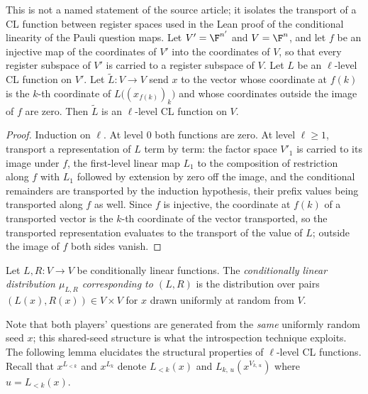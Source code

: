 \begin{lemma}\label{lem:cl-reindex}
	\leanok
	This is not a named statement of the source article; it isolates the transport of a CL function between register spaces used in the Lean proof of the conditional linearity of the Pauli question maps. Let $V' = \F^{n'}$ and $V = \F^{n}$, and let $f$ be an injective map of the coordinates of $V'$ into the coordinates of $V$, so that every register subspace of $V'$ is carried to a register subspace of $V$. Let $L$ be an $\ell$-level CL function on $V'$. Let $\tilde L \colon V \to V$ send $x$ to the vector whose coordinate at $f(k)$ is the $k$-th coordinate of $L\bigl( (x_{f(k)})_k \bigr)$ and whose coordinates outside the image of $f$ are zero. Then $\tilde L$ is an $\ell$-level CL function on $V$.
\end{lemma}
\begin{proof}
	\leanok
	Induction on $\ell$. At level $0$ both functions are zero. At level $\ell \ge 1$, transport a representation of $L$ term by term: the factor space $V'_1$ is carried to its image under $f$, the first-level linear map $L_1$ to the composition of restriction along $f$ with $L_1$ followed by extension by zero off the image, and the conditional remainders are transported by the induction hypothesis, their prefix values being transported along $f$ as well. Since $f$ is injective, the coordinate at $f(k)$ of a transported vector is the $k$-th coordinate of the vector transported, so the transported representation evaluates to the transport of the value of $L$; outside the image of $f$ both sides vanish.
\end{proof}

\begin{definition}\label{def:cl-dist}
	\leanok
	Let $L, R \colon V \to V$ be conditionally linear functions. The \emph{conditionally linear distribution $\mu_{L,R}$ corresponding to $(L,R)$} is the distribution over pairs $(L(x), R(x)) \in V \times V$ for $x$ drawn uniformly at random from $V$.
\end{definition}

Note that both players' questions are generated from the \emph{same} uniformly random seed $x$; this shared-seed structure is what the introspection technique exploits. The following lemma elucidates the structural properties of $\ell$-level CL functions. Recall that $x^{L_{<k}}$ and $x^{L_k}$ denote $L_{<k}(x)$ and $L_{k,\,u}(x^{V_{k,\,u}})$ where $u = L_{<k}(x)$.

